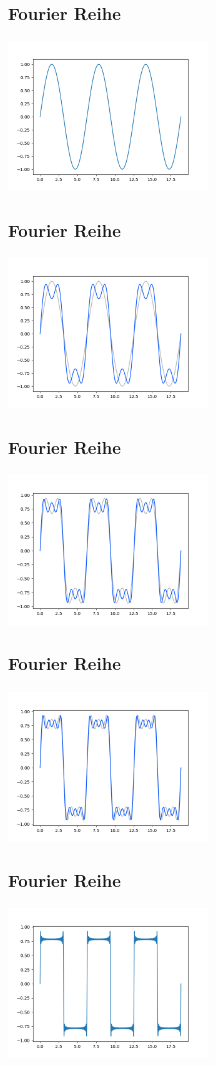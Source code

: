 \begin{frame}
	\frametitle{Fourier Reihe}
	\includegraphics[width=200px]{images/00-rect-0.png}
\end{frame}

\begin{frame}
	\frametitle{Fourier Reihe}
	\includegraphics[width=200px]{images/00-rect-1.png}
\end{frame}

\begin{frame}
	\frametitle{Fourier Reihe}
	\includegraphics[width=200px]{images/00-rect-2.png}
\end{frame}

\begin{frame}
	\frametitle{Fourier Reihe}
	\includegraphics[width=200px]{images/00-rect-3.png}
\end{frame}

\begin{frame}
	\frametitle{Fourier Reihe}
	\includegraphics[width=200px]{images/00-rect-4.png}
\end{frame}

